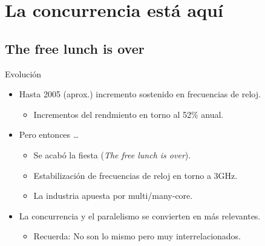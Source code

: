 \section{La concurrencia está aquí}

\subsection{The free lunch is over}


\begin{frame}[t]{Evolución}
\begin{itemize}
  \item Hasta 2005 (aprox.) incremento sostenido en frecuencias de reloj.
    \begin{itemize}
      \item Incrementos del rendmiento en torno al 52\% anual.
    \end{itemize}
  \vspace{12pt}
  \pause
  \item Pero entonces \ldots
    \begin{itemize}
      \item Se acabó la fiesta (\emph{The free lunch is over}).
      \item Estabilización de frecuencias de reloj en torno a 3GHz.
      \item La industria apuesta por multi/many-core.
    \end{itemize}
  \vspace{12pt}
  \pause
  \item La concurrencia y el paralelismo se convierten en más relevantes.
    \begin{itemize}
      \item \alert{Recuerda}: No son lo mismo pero muy interrelacionados.
    \end{itemize}
\end{itemize}
\end{frame}

